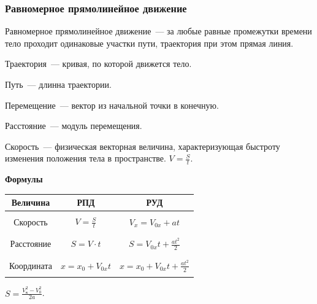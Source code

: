 \documentclass[12pt]{article}
\begin{document}
	\subsubsection{Равномерное прямолинейное движение}
	\begin{definition}
		Равномерное прямолинейное движение~--- за любые равные промежутки времени тело проходит одинаковые участки пути, траектория при этом прямая линия.
	\end{definition}
	\begin{definition}
		Траектория~--- кривая, по которой движется тело.
	\end{definition}
	\begin{definition}
		Путь~--- длинна траектории.
	\end{definition}
	\begin{definition}
		Перемещение~--- вектор из начальной точки в конечную.
	\end{definition}
	\begin{definition}
		Расстояние~--- модуль перемещения.
	\end{definition}
	\begin{definition}
		Скорость~--- физическая векторная величина, характеризующая быстроту изменения положения тела в пространстве. $V = \frac{S}{t}$.
	\end{definition}
	\noindent
	\textbf{Формулы}\\
	\begin{tabular}{|c|c|c|}
		\hline
		\textbf{Величина} & \textbf{РПД} & \textbf{РУД}\\
		\hline
		 & &\\
		Скорость & $V = \frac{S}{t}$ & $V_x = V_{0x} + at$\\
		 & &\\
		\hline
		 & &\\
		Расстояние & $S = V \cdot t$ & $S = V_{0x}t + \frac{at^2}{2}$\\
		 & &\\
		\hline
		 & &\\
		Координата & $x = x_0 + V_{0x}t$ & $x = x_0 + V_{0x}t + \frac{at^2}{2}$\\
		 & &\\
		\hline
	\end{tabular}
	\begin{statement}
		$S = \frac{V_{\text{к}}^2 - V_0^2}{2a}$.
	\end{statement}
\end{document}
